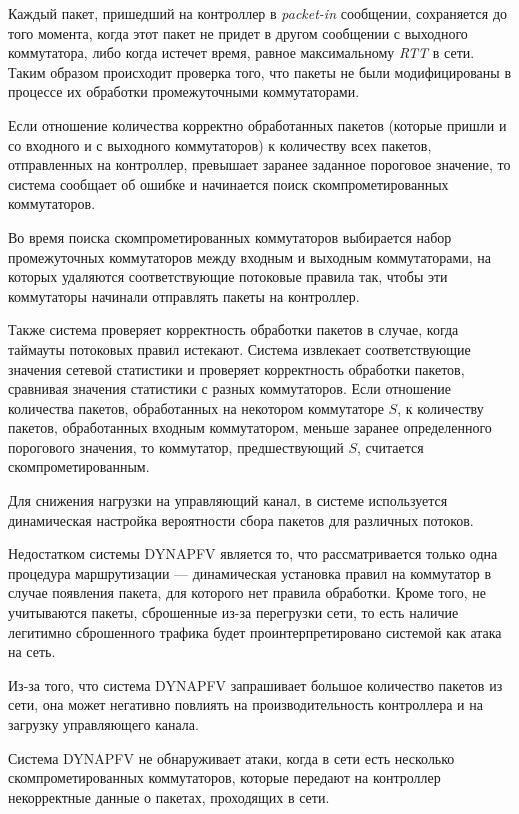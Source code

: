 \documentclass[../thesis.tex]{subfiles}
\begin{document}
Каждый пакет, пришедший на контроллер в \textit{packet-in} сообщении, сохраняется до того момента, когда этот пакет не придет в другом сообщении с выходного коммутатора, либо когда истечет время, равное максимальному \textit{RTT} \cite{tanenbaum1996computer} в сети.
Таким образом происходит проверка того, что пакеты не были модифицированы в процессе их обработки промежуточными коммутаторами.

Если отношение количества корректно обработанных пакетов (которые пришли и со входного и с выходного коммутаторов) к количеству всех пакетов, отправленных на контроллер, превышает заранее заданное пороговое значение, то система сообщает об ошибке и начинается поиск скомпрометированных коммутаторов.

Во время поиска скомпрометированных коммутаторов выбирается набор промежуточных коммутаторов между входным и выходным коммутаторами, на которых удаляются соответствующие потоковые правила так, чтобы эти коммутаторы начинали отправлять пакеты на контроллер.

Также система проверяет корректность обработки пакетов в случае, когда таймауты потоковых правил истекают.
Система извлекает соответствующие значения сетевой статистики и проверяет корректность обработки пакетов, сравнивая значения статистики с разных коммутаторов.
Если отношение количества пакетов, обработанных на некотором коммутаторе $S$, к количеству пакетов, обработанных входным коммутатором, меньше заранее определенного порогового значения, то коммутатор, предшествующий $S$, считается скомпрометированным.

Для снижения нагрузки на управляющий канал, в системе используется динамическая настройка вероятности сбора пакетов для различных потоков.

Недостатком системы DYNAPFV является то, что рассматривается только одна процедура маршрутизации --- динамическая установка правил на коммутатор в случае появления пакета, для которого нет правила обработки.
Кроме того, не учитываются пакеты, сброшенные из-за перегрузки сети, то есть наличие легитимно сброшенного трафика будет проинтерпретировано системой как атака на сеть.

Из-за того, что система DYNAPFV запрашивает большое количество пакетов из сети, она может негативно повлиять на производительность контроллера и на загрузку управляющего канала.

Система DYNAPFV не обнаруживает атаки, когда в сети есть несколько скомпрометированных коммутаторов, которые передают на контроллер некорректные данные о пакетах, проходящих в сети.
\end{document}
